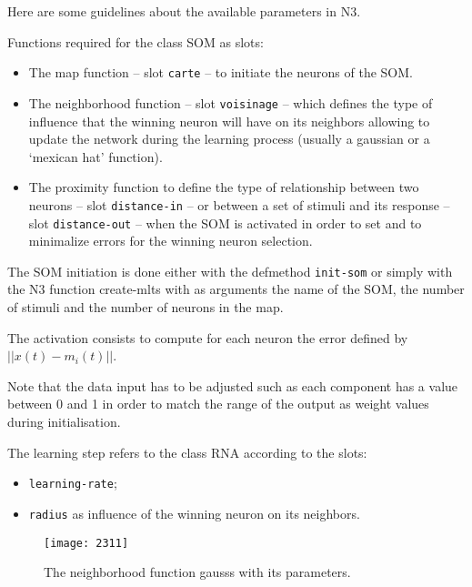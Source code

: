 \bigskip

Here are some guidelines about the available parameters in N3.

\bigskip
Functions required for the class SOM as slots:

\begin{itemize}
\item The map function -- slot \texttt{carte} -- to initiate the neurons of the SOM.
\item The neighborhood function -- slot \texttt{voisinage} -- which defines the type of influence that the winning neuron will have on its neighbors allowing to update the network during the learning process (usually a gaussian or a `mexican hat' function).
\item The proximity function to define the type of relationship %
between two neurons -- slot \texttt{distance-in} --  
or between a set of stimuli and its response -- slot \texttt{distance-out} -- when the SOM is activated in order to set and to minimalize errors for the winning neuron selection.
\end{itemize}

\bigskip

The SOM initiation is done either with the defmethod \texttt{init-som} or simply with the N3 function \glspl{create-mlt} with as arguments the name of the SOM, the number of stimuli and the number of neurons in the map.

\smallskip

The activation consists to compute for each neuron the error defined by $|| x(t) - m_i(t) ||$. 

\smallskip

Note that the data input has to be adjusted such as each component has a value between 0 and 1 in order to match the range of the output as weight values during initialisation.

\bigskip

The learning step refers to the class RNA according to the slots:

\begin{itemize}
\item \texttt{learning-rate};
\item \texttt{radius} as influence of the winning neuron on its neighbors. 
\end{itemize}

\begin{figure}[htbp]
\begin{center}
\texttt{[image: 2311]}
\caption{The neighborhood function \glspl{gauss} with its parameters. %
}
\label{fig:gs}
\end{center}
\end{figure}

